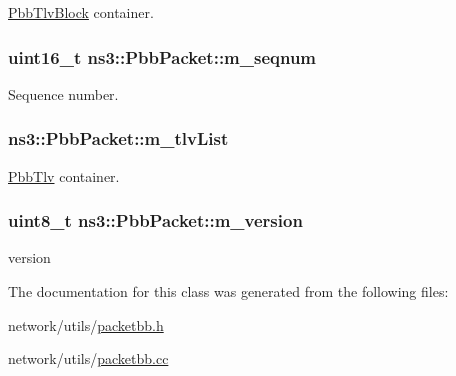 \hyperlink{classns3_1_1PbbTlvBlock}{Pbb\+Tlv\+Block} container. 

\subsubsection[{\texorpdfstring{m\+\_\+seqnum}{m_seqnum}}]{\setlength{\rightskip}{0pt plus 5cm}uint16\+\_\+t ns3\+::\+Pbb\+Packet\+::m\+\_\+seqnum\hspace{0.3cm}{\ttfamily [private]}}\hypertarget{classns3_1_1PbbPacket_ad208a9f1466b5c3355886225db32d003}{}\label{classns3_1_1PbbPacket_ad208a9f1466b5c3355886225db32d003}


Sequence number. 

\subsubsection[{\texorpdfstring{m\+\_\+tlv\+List}{m_tlvList}}]{ ns3\+::\+Pbb\+Packet\+::m\+\_\+tlv\+List\hspace{0.3cm}{\ttfamily [private]}}\hypertarget{classns3_1_1PbbPacket_af24e9b73e6b1d8c113b52041860e9a35}{}\label{classns3_1_1PbbPacket_af24e9b73e6b1d8c113b52041860e9a35}


\hyperlink{classns3_1_1PbbTlv}{Pbb\+Tlv} container. 

\subsubsection[{\texorpdfstring{m\+\_\+version}{m_version}}]{\setlength{\rightskip}{0pt plus 5cm}uint8\+\_\+t ns3\+::\+Pbb\+Packet\+::m\+\_\+version\hspace{0.3cm}{\ttfamily [private]}}\hypertarget{classns3_1_1PbbPacket_a087fc7baaed63b3bf0e8e0ec5f555642}{}\label{classns3_1_1PbbPacket_a087fc7baaed63b3bf0e8e0ec5f555642}


version 



The documentation for this class was generated from the following files\+:\begin{DoxyCompactItemize}
\item 
network/utils/\hyperlink{packetbb_8h}{packetbb.\+h}\item 
network/utils/\hyperlink{packetbb_8cc}{packetbb.\+cc}\end{DoxyCompactItemize}
